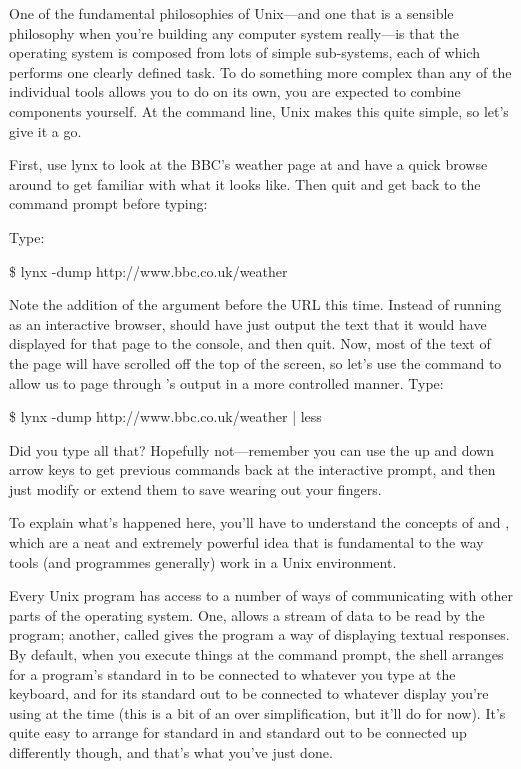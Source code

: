 One of the fundamental philosophies of Unix---and one that is a sensible philosophy when you're building any computer system really---is that the operating system is composed from lots of simple sub-systems, each of which performs one clearly defined task. To do something more complex than any of the individual tools allows you to do on its own, you are expected to combine components yourself. At the command line, Unix makes this quite simple, so let's give it a go. 

First, use lynx to look at the BBC's weather page at  and have a quick browse around to get familiar with what it looks like. Then quit  and get back to the command prompt before typing:

Type:
\begin{ttoutenv}
\$ lynx -dump http://www.bbc.co.uk/weather
\end{ttoutenv}

Note the addition of the  argument before the URL this time. Instead of running as an interactive browser,  should have just output the text that it would have displayed for that page to the console, and then quit. Now, most of the text of the page will have scrolled off the top of the screen, so let's use the  command to allow us to page through 's output in a more controlled manner. Type:

\begin{ttoutenv}
\$ lynx -dump http://www.bbc.co.uk/weather | less
\end{ttoutenv}

Did you type all that? Hopefully not---remember you can use the up and down arrow keys to get previous commands back at the interactive prompt, and then just modify or extend them to save wearing out your fingers.

To explain what's happened here, you'll have to understand the concepts of  and , which are a neat and extremely powerful idea that is fundamental to the way tools (and programmes generally) work in a Unix environment. 

Every Unix program has access to a number of ways of communicating with other parts of the operating system. One,  allows a stream of data to be read by the program; another, called  gives the program a way of displaying textual responses. By default, when you execute things at the command prompt, the shell arranges for a program's standard in to be connected to whatever you type at the keyboard, and for its standard out to be connected to whatever display you're using at the time (this is a bit of an over simplification, but it'll do for now). It's quite easy to arrange for standard in and standard out to be connected up differently though, and that's what you've just done.

